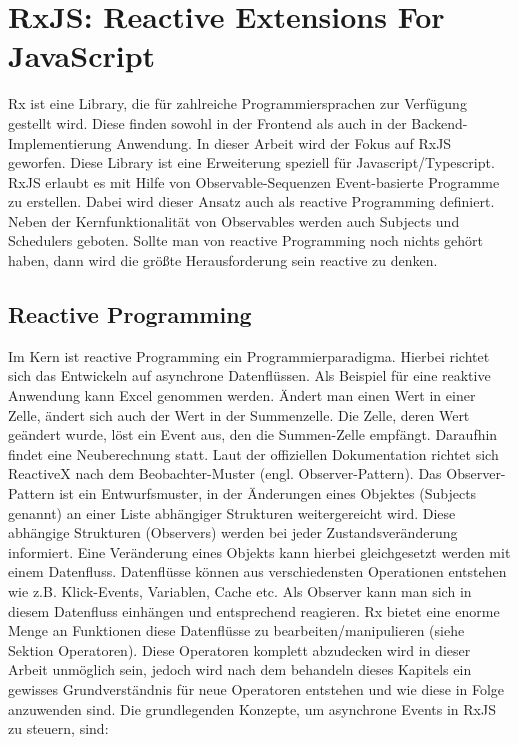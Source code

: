 \section{RxJS: Reactive Extensions For JavaScript}
Rx ist eine Library, die für zahlreiche Programmiersprachen zur Verfügung gestellt wird. Diese finden sowohl in der Frontend als auch in der Backend-Implementierung Anwendung. In dieser Arbeit wird der Fokus auf RxJS geworfen. Diese Library ist eine Erweiterung speziell für Javascript/Typescript. RxJS erlaubt es mit Hilfe von Observable-Sequenzen Event-basierte Programme zu erstellen. Dabei wird dieser Ansatz auch als reactive Programming definiert. Neben der Kernfunktionalität von Observables werden auch Subjects und Schedulers geboten. Sollte man von reactive Programming noch nichts gehört haben, dann wird die größte Herausforderung sein \glqq{}reactive\grqq{} zu denken.

\subsection{Reactive Programming}
Im Kern ist reactive Programming ein Programmierparadigma. Hierbei richtet sich das Entwickeln auf asynchrone Datenflüssen. Als Beispiel für eine reaktive Anwendung kann Excel genommen werden. Ändert man einen Wert in einer Zelle, ändert sich auch der Wert in der Summenzelle. Die Zelle, deren Wert geändert wurde, löst ein Event aus, den die Summen-Zelle empfängt. Daraufhin findet eine Neuberechnung statt.\cite{reactive-programming-beispiel} Laut der offiziellen Dokumentation richtet sich ReactiveX nach dem Beobachter-Muster (engl. Observer-Pattern). Das Observer-Pattern ist ein Entwurfsmuster, in der Änderungen eines Objektes (Subjects genannt) an einer Liste abhängiger Strukturen weitergereicht wird. Diese abhängige Strukturen (Observers) werden bei jeder Zustandsveränderung informiert. Eine Veränderung eines Objekts kann hierbei gleichgesetzt werden mit einem Datenfluss. Datenflüsse können aus verschiedensten Operationen entstehen wie z.B. Klick-Events, Variablen, Cache etc. Als Observer kann man sich in diesem Datenfluss einhängen und entsprechend reagieren.\cite{rx-intro} Rx bietet eine enorme Menge an Funktionen diese Datenflüsse zu bearbeiten/manipulieren (siehe Sektion Operatoren). Diese Operatoren komplett abzudecken wird in dieser Arbeit unmöglich sein, jedoch wird nach dem behandeln dieses Kapitels ein gewisses Grundverständnis für neue Operatoren entstehen und wie diese in Folge anzuwenden sind. Die grundlegenden Konzepte, um asynchrone Events in RxJS zu steuern, sind:

